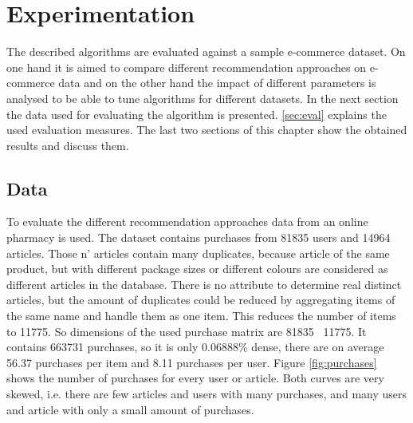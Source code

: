 \documentclass[10pt]{reportMaster}
\begin{document}






\chapter{Experimentation}
\label{chap:experimentation}
The described algorithms are evaluated against a sample e-commerce dataset.
On one hand it is aimed to compare different recommendation approaches on e-commerce data and on the other hand the impact of different parameters is analysed to be able to tune algorithms for different datasets.
In the next section the data used for evaluating the algorithm is presented.
\ref{sec:eval} explains the used evaluation measures.
The last two sections of this chapter show the obtained results and discuss them.

\section{Data}
\label{sec:data}

To evaluate the different recommendation approaches data from an online pharmacy is used.
The dataset contains purchases from 81835 users and 14964 articles.
Those n' articles contain many duplicates, because article of the same product, but with different package sizes or different colours are considered as different articles in the database.
There is no attribute to determine real distinct articles, but the amount of duplicates could be reduced by aggregating items of the same name and handle them as one item.
This reduces the number of items to 11775.
So dimensions of the used purchase matrix are 81835 \texttimes \ 11775.
It contains 663731 purchases, so it is only 0.06888\% dense, there are on average 56.37 purchases per item and 8.11 purchases per user. %
Figure \ref{fig:purchases} shows the number of purchases for every user or article.
Both curves are very skewed, i.e. there are few articles and users with many purchases, and many users and article with only a small amount of purchases.

\end{document}
